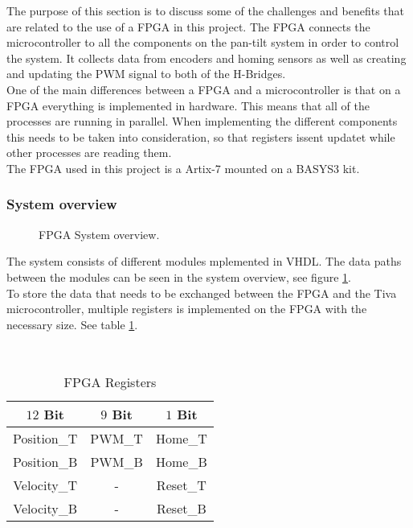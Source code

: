\documentclass[../../../main]{subfiles}
\begin{document}
The purpose of this section is to discuss some of the challenges and benefits that are related to the use of a FPGA in this project.
The FPGA connects the microcontroller to all the components on the pan-tilt system in order to control the system. It collects data from encoders and homing sensors as well as creating and updating the PWM signal to both of the H-Bridges.
\\
One of the main differences between a FPGA and a microcontroller is that on a FPGA everything is implemented in hardware. This means that all of the processes are running in parallel.
When  implementing the different components this needs to be taken into consideration, so that registers issent updatet while other processes are reading them.
\\
The FPGA used in this project is a Artix-7 mounted on a BASYS3 kit. 
\subsubsection{System overview}%
\label{sub:system_overview}

\begin{figure}[H]
  \centering
  \def\svgwidth{\textwidth}
  
  \caption{FPGA System overview.}
  \label{fig:FPGA_system_overview}
\end{figure}
The system consists of different modules mplemented in VHDL.
The data paths between the modules can be seen in the system overview, see figure \ref{fig:FPGA_system_overview}.
\\
To  store the data that needs to be exchanged between the FPGA and the Tiva microcontroller, multiple registers is implemented on the FPGA with the necessary size. See table \ref{table:FPGA_registers}.

\\
\begin{table}[H]
\centering
\begin{tabular}{|c|c|c|}
\hline
\textbf{$12$ Bit} & \textbf{$9$ Bit} & \textbf{$1$ Bit} \\ \hline
Position\_T     & PWM\_T         & Home\_T        \\ \hline
Position\_B     & PWM\_B         & Home\_B        \\ \hline
Velocity\_T     & -              & Reset\_T       \\ \hline
Velocity\_B     & -              & Reset\_B       \\ \hline
\end{tabular}
\caption{FPGA Registers}
\label{table:FPGA_registers}
\end{table}
\end{document}
